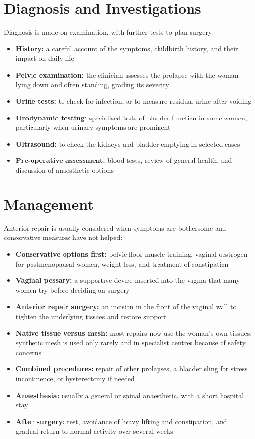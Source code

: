 \section*{Diagnosis and Investigations}
Diagnosis is made on examination, with further tests to plan surgery:

\begin{itemize}
    \item \textbf{History:} a careful account of the symptoms, childbirth history, and their impact on daily life
    \item \textbf{Pelvic examination:} the clinician assesses the prolapse with the woman lying down and often standing, grading its severity
    \item \textbf{Urine tests:} to check for infection, or to measure residual urine after voiding
    \item \textbf{Urodynamic testing:} specialised tests of bladder function in some women, particularly when urinary symptoms are prominent
    \item \textbf{Ultrasound:} to check the kidneys and bladder emptying in selected cases
    \item \textbf{Pre-operative assessment:} blood tests, review of general health, and discussion of anaesthetic options
\end{itemize}

\section*{Management}
Anterior repair is usually considered when symptoms are bothersome and conservative measures have not helped:

\begin{itemize}
    \item \textbf{Conservative options first:} pelvic floor muscle training, vaginal oestrogen for postmenopausal women, weight loss, and treatment of constipation
    \item \textbf{Vaginal pessary:} a supportive device inserted into the vagina that many women try before deciding on surgery
    \item \textbf{Anterior repair surgery:} an incision in the front of the vaginal wall to tighten the underlying tissues and restore support
    \item \textbf{Native tissue versus mesh:} most repairs now use the woman's own tissues; synthetic mesh is used only rarely and in specialist centres because of safety concerns
    \item \textbf{Combined procedures:} repair of other prolapses, a bladder sling for stress incontinence, or hysterectomy if needed
    \item \textbf{Anaesthesia:} usually a general or spinal anaesthetic, with a short hospital stay
    \item \textbf{After surgery:} rest, avoidance of heavy lifting and constipation, and gradual return to normal activity over several weeks
\end{itemize}

